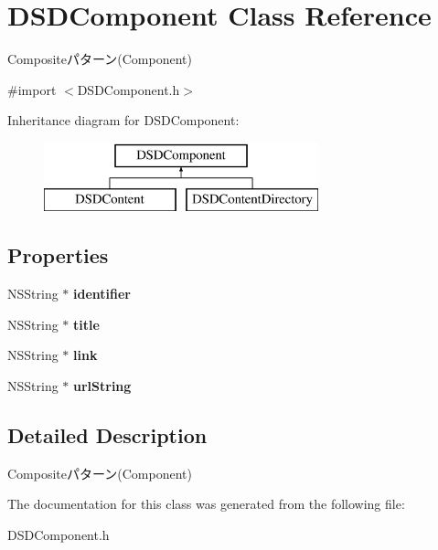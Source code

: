 \hypertarget{interface_d_s_d_component}{\section{D\-S\-D\-Component Class Reference}
\label{interface_d_s_d_component}
}


Compositeパターン(\-Component)  




{\ttfamily \#import $<$D\-S\-D\-Component.\-h$>$}

Inheritance diagram for D\-S\-D\-Component\-:\begin{figure}[H]
\begin{center}
\leavevmode
\includegraphics[height=2.000000cm]{interface_d_s_d_component}
\end{center}
\end{figure}
\subsection*{Properties}
\begin{DoxyCompactItemize}
\item 
\hypertarget{interface_d_s_d_component_a91abdb3532d8028098739eada3ce105f}{N\-S\-String $\ast$ {\bfseries identifier}}\label{interface_d_s_d_component_a91abdb3532d8028098739eada3ce105f}

\item 
\hypertarget{interface_d_s_d_component_adbab9565a17b5162099c9fb4a2bafc5d}{N\-S\-String $\ast$ {\bfseries title}}\label{interface_d_s_d_component_adbab9565a17b5162099c9fb4a2bafc5d}

\item 
\hypertarget{interface_d_s_d_component_ab1808b8fe98650c8a66e12c36f5030c0}{N\-S\-String $\ast$ {\bfseries link}}\label{interface_d_s_d_component_ab1808b8fe98650c8a66e12c36f5030c0}

\item 
\hypertarget{interface_d_s_d_component_af70fd68309a8696f5af202f0b4e84a01}{N\-S\-String $\ast$ {\bfseries url\-String}}\label{interface_d_s_d_component_af70fd68309a8696f5af202f0b4e84a01}

\end{DoxyCompactItemize}


\subsection{Detailed Description}
Compositeパターン(\-Component) 

The documentation for this class was generated from the following file\-:\begin{DoxyCompactItemize}
\item 
D\-S\-D\-Component.\-h\end{DoxyCompactItemize}
